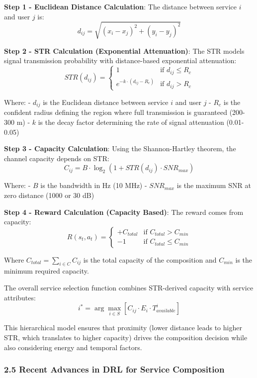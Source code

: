 \documentclass[
  10pt,
  twocolumn,
]{article}
\begin{document}
\textbf{Step 1 - Euclidean Distance Calculation}: The distance between
service \(i\) and user \(j\) is:
\[d_{ij} = \sqrt{(x_i - x_j)^2 + (y_i - y_j)^2}\]

\textbf{Step 2 - STR Calculation (Exponential Attenuation)}: The STR
models signal transmission probability with distance-based exponential
attenuation:
\[STR(d_{ij}) = \begin{cases} 1 & \text{if } d_{ij} \leq R_c \\ e^{-k \cdot (d_{ij} - R_c)} & \text{if } d_{ij} > R_c \end{cases}\]

Where: - \(d_{ij}\) is the Euclidean distance between service \(i\) and
user \(j\) - \(R_c\) is the confident radius defining the region where
full transmission is guaranteed (200-300 m) - \(k\) is the decay factor
determining the rate of signal attenuation (0.01-0.05)

\textbf{Step 3 - Capacity Calculation}: Using the Shannon-Hartley
theorem, the channel capacity depends on STR:
\[C_{ij} = B \cdot \log_2(1 + STR(d_{ij}) \cdot SNR_{max})\]

Where: - \(B\) is the bandwidth in Hz (10 MHz) - \(SNR_{max}\) is the
maximum SNR at zero distance (1000 or 30 dB)

\textbf{Step 4 - Reward Calculation (Capacity Based)}: The reward comes
from capacity:
\[R(s_t, a_t) = \begin{cases} +C_{total} & \text{if } C_{total} > C_{min} \\ -1 & \text{if } C_{total} \leq C_{min} \end{cases}\]

Where \(C_{total} = \sum_{i \in C} C_{ij}\) is the total capacity of the
composition and \(C_{min}\) is the minimum required capacity.

The overall service selection function combines STR-derived capacity
with service attributes:
\[i^* = \arg\max_{i \in S} \left[ C_{ij} \cdot E_i \cdot T_{available}^i \right]\]

This hierarchical model ensures that proximity (lower distance leads to
higher STR, which translates to higher capacity) drives the composition
decision while also considering energy and temporal factors.

\hypertarget{recent-advances-in-drl-for-service-composition}{%
	\subsubsection{2.5 Recent Advances in DRL for Service
		Composition}\label{recent-advances-in-drl-for-service-composition}}
\end{document}
